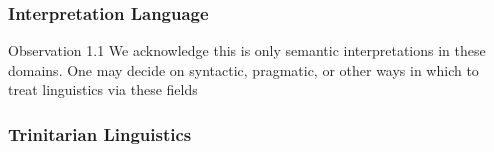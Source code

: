 \documentclass[10pt]{beamer}
\begin{document}
\begin{frame}[fragile]
\frametitle{Interpretation Language}
\begin{alertblock}{Observation 1.1}
  We acknowledge this is only semantic interpretations in these domains.
  One may decide on syntactic, pragmatic, or other ways in which to treat
  linguistics via these fields
\end{alertblock}
\centering
{}

\end{frame}


\begin{frame}[fragile]
\frametitle{Trinitarian Linguistics }
\centering
{}

\end{frame}
\end{document}
